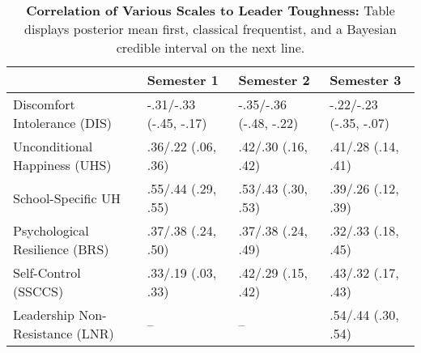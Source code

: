 \begin{table}[ht]
\centering
\begin{tabular}{llll}
  \hline
 & Semester 1 & Semester 2 & Semester 3 \\ 
  \hline
Discomfort Intolerance (DIS) & -.31/-.33 (-.45, -.17) & -.35/-.36 (-.48, -.22) & -.22/-.23 (-.35, -.07) \\ 
  Unconditional Happiness (UHS) & .36/.22 (.06, .36) & .42/.30 (.16, .42) & .41/.28 (.14, .41) \\ 
  School-Specific UH & .55/.44 (.29, .55) & .53/.43 (.30, .53) & .39/.26 (.12, .39) \\ 
  Psychological Resilience (BRS) & .37/.38 (.24, .50) & .37/.38 (.24, .49) & .32/.33 (.18, .45) \\ 
  Self-Control (SSCCS) & .33/.19 (.03, .33) & .42/.29 (.15, .42) & .43/.32 (.17, .43) \\ 
  Leadership Non-Resistance (LNR) & -- & -- & .54/.44 (.30, .54) \\ 
   \hline
\end{tabular}
\caption{\textbf{Correlation of Various Scales to Leader Toughness:} Table displays posterior mean first, classical frequentist, and a Bayesian credible interval on the next line.} 
\label{tab:edc_corr}
\end{table}

